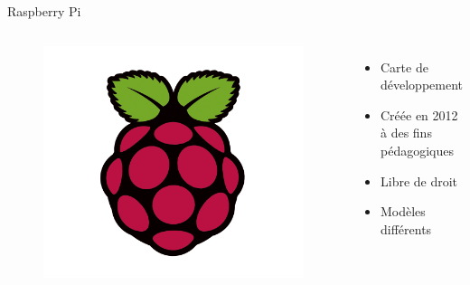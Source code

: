 \documentclass[aspectratio=169,xcolor=dvipsnames]{beamer}
\begin{document}
\begin{frame}{Raspberry Pi}
    \begin{columns}[c] %

        \begin{figure}
            \includegraphics[width=1\textwidth]{images/logo-rpi.png}
        \end{figure}

        \begin{itemize}
            \item Carte de développement
            \item Créée en 2012 à des fins pédagogiques
            \item Libre de droit
            \item Modèles différents
        \end{itemize}

    \end{columns}
\end{frame}

\end{document}

